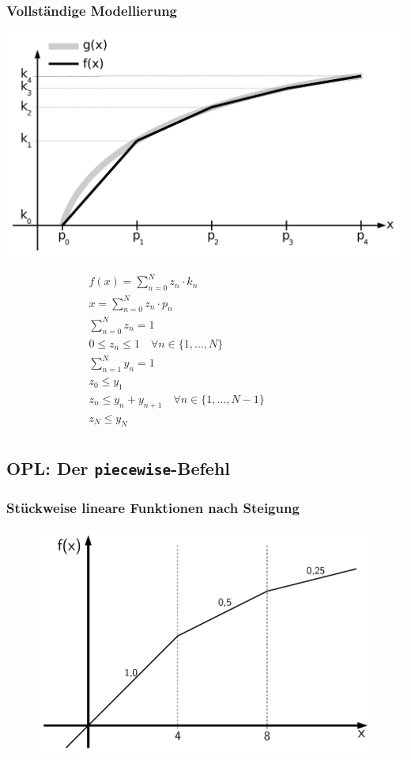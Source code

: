 \begin{frame}
 \frametitle{Vollständige Modellierung}
 \begin{flushright}
  \includegraphics[width=.5\textwidth,page=2]{Bilder/StueckweiseLineareFunktion1}
 \end{flushright}
 \vspace{-15ex}\small
 \begin{align*}
  &f(x) = \sum_{n=0}^N z_n\cdot k_n\\
  &x = \sum_{n=0}^{N} z_n\cdot p_n\\
  &\sum_{n=0}^N z_n = 1\\
  &0 \leq z_n \leq 1\quad\forall n\in\{1, \ldots, N\}\\
  &\sum_{n=1}^{N}{y_n} = 1\\
  &z_0 \leq y_1\\
  &z_n \leq y_n + y_{n+1}\quad\forall n\in\{1, \ldots, N-1\}\qquad\qquad\qquad\mbox{}\\
  &z_N \leq y_N\\
 \end{align*}
\end{frame}

\subsection{OPL: Der \texttt{piecewise}-Befehl}
\begin{frame}
 \frametitle{Stückweise lineare Funktionen nach Steigung}
 \begin{figure}
  \centering
  \includegraphics[width=\linewidth,page=1]{Bilder/StueckweiseLineareFunktion3}
 \end{figure}
\end{frame}


